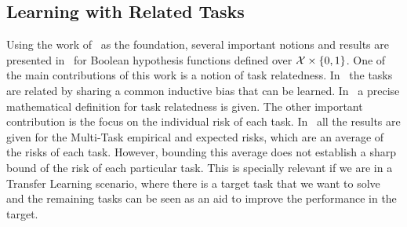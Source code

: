 
\subsection{Learning with Related Tasks} %
Using the work of~\cite{baxter2000model} as the foundation, several important notions and results are presented in~\cite{Ben-DavidB08} for Boolean hypothesis functions defined over $\mathcal{X} \times \left\{0, 1\right\}$.
One of the main contributions of this work is a notion of task relatedness. In~\cite{baxter2000model} the tasks are related by sharing a common inductive bias that can be learned. In~\cite{Ben-DavidB08} a precise mathematical definition for task relatedness is given.
The other important contribution is the focus on the individual risk of each task. In~\cite{baxter2000model} all the results are given for the Multi-Task empirical and expected risks, which are an average of the risks of each task. However, bounding this average does not establish a sharp bound of the risk of each particular task. This is specially relevant if we are in a Transfer Learning scenario, where there is a target task that we want to solve and the remaining tasks can be seen as an aid to improve the performance in the target.

